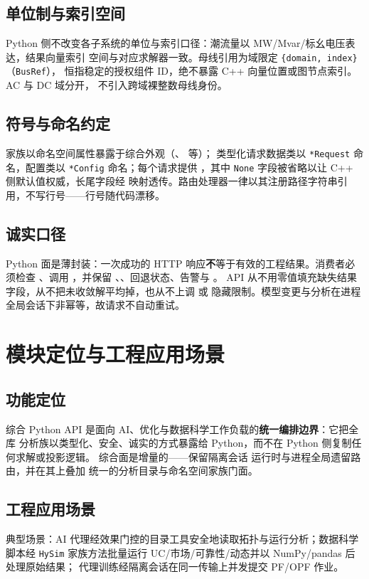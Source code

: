 \documentclass[UTF8,fontset=fandol,a4paper,11pt]{ctexart}
\begin{document}
\subsection{单位制与索引空间}
Python 侧不改变各子系统的单位与索引口径：潮流量以 MW/Mvar/标幺电压表达，结果向量索引
空间与对应求解器一致。母线引用为域限定 \texttt{\{domain, index\}}（\texttt{BusRef}），
 恒指稳定的授权组件 ID，绝不暴露 C++ 向量位置或图节点索引。AC 与 DC 域分开，
不引入跨域裸整数母线身份。

\subsection{符号与命名约定}
家族以命名空间属性暴露于综合外观（、 等）；
类型化请求数据类以 \texttt{*Request} 命名，配置类以 \texttt{*Config} 命名；每个请求提供
，其中 \texttt{None} 字段被省略以让 C++ 侧默认值权威，长尾字段经
 映射透传。路由处理器一律以其注册路径字符串引用，不写行号——行号随代码漂移。

\subsection{诚实口径}
Python 面是薄封装：一次成功的 HTTP 响应\textbf{不}等于有效的工程结果。消费者必须检查
、调用 ，并保留
、、回退状态、告警与 。
API 从不用零值填充缺失结果字段，从不把未收敛解平均掉，也从不上调  或
隐藏限制。模型变更与分析在进程全局会话下非幂等，故请求不自动重试。

\section{模块定位与工程应用场景}
\subsection{功能定位}
综合 Python API 是面向 AI、优化与数据科学工作负载的\textbf{统一编排边界}：它把全库
分析族以类型化、安全、诚实的方式暴露给 Python，而不在 Python 侧复制任何求解或投影逻辑。
综合面是增量的——保留隔离会话  运行时与进程全局遗留路由，并在其上叠加
统一的分析目录与命名空间家族门面。

\subsection{工程应用场景}
典型场景：AI 代理经效果门控的目录工具安全地读取拓扑与运行分析；数据科学脚本经
\texttt{HySim} 家族方法批量运行 UC/市场/可靠性/动态并以 NumPy/pandas 后处理原始结果；
代理训练经隔离会话在同一传输上并发提交 PF/OPF 作业。
\end{document}
